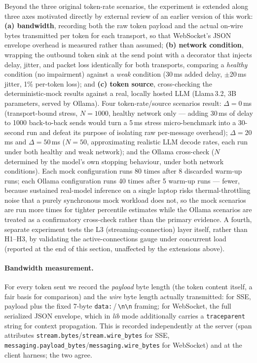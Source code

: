 \documentclass[11pt]{article}
\begin{document}
Beyond the three original token-rate scenarios, the experiment is extended along three axes motivated directly by external review of an earlier version of this work: \textbf{(a) bandwidth}, recording both the raw token payload and the actual on-wire bytes transmitted per token for each transport, so that WebSocket's JSON envelope overhead is measured rather than assumed; \textbf{(b) network condition}, wrapping the outbound token sink at the send point with a decorator that injects delay, jitter, and packet loss identically for both transports, comparing a \emph{healthy} condition (no impairment) against a \emph{weak} condition (30\,ms added delay, $\pm$20\,ms jitter, 1\% per-token loss); and \textbf{(c) token source}, cross-checking the deterministic-mock results against a real, locally hosted LLM (Llama\,3.2, 3B parameters, served by Ollama). Four token-rate/source scenarios result: $\Delta=0$\,ms (transport-bound stress, $N=1000$, healthy network only --- adding 30\,ms of delay to 1000 back-to-back sends would turn a 5\,ms stress micro-benchmark into a 30-second run and defeat its purpose of isolating raw per-message overhead); $\Delta=20$\,ms and $\Delta=50$\,ms ($N=50$, approximating realistic LLM decode rates, each run under both healthy and weak network); and the Ollama cross-check ($N$ determined by the model's own stopping behaviour, under both network conditions). Each mock configuration runs 80 times after 8 discarded warm-up runs; each Ollama configuration runs 40 times after 5 warm-up runs --- fewer, because sustained real-model inference on a single laptop risks thermal-throttling noise that a purely synchronous mock workload does not, so the mock scenarios are run more times for tighter percentile estimates while the Ollama scenarios are treated as a confirmatory cross-check rather than the primary evidence. A fourth, separate experiment tests the L3 (streaming-connection) layer itself, rather than H1--H3, by validating the active-connections gauge under concurrent load (reported at the end of this section, unaffected by the extensions above).

\paragraph{Bandwidth measurement.} For every token sent we record the \emph{payload} byte length (the token content itself, a fair basis for comparison) and the \emph{wire} byte length actually transmitted: for SSE, payload plus the fixed 7-byte \texttt{data:}\,/\,\texttt{\textbackslash n\textbackslash n} framing; for WebSocket, the full serialized JSON envelope, which in \emph{lib} mode additionally carries a \texttt{traceparent} string for context propagation. This is recorded independently at the server (span attributes \texttt{stream.bytes}\slash\texttt{stream.wire\_bytes} for SSE, \texttt{messaging.payload\_bytes}\slash\texttt{messaging.wire\_bytes} for WebSocket) and at the client harness; the two agree.
\end{document}
